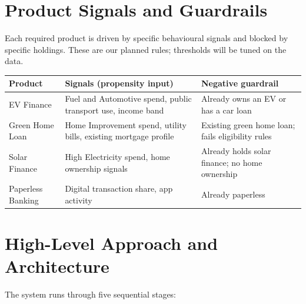 \documentclass[11pt,a4paper]{article}
\begin{document}
\section{Product Signals and Guardrails}
Each required product is driven by specific behavioural signals and blocked by specific holdings. These are our planned rules; thresholds will be tuned on the data.

\begin{center}
\small
\begin{tabular}{|p{3.2cm}|p{5.5cm}|p{5.9cm}|}
\hline
\textbf{Product} & \textbf{Signals (propensity input)} & \textbf{Negative guardrail} \\ \hline
EV Finance & Fuel and Automotive spend, public transport use, income band & Already owns an EV or has a car loan \\ \hline
Green Home Loan & Home Improvement spend, utility bills, existing mortgage profile & Existing green home loan; fails eligibility rules \\ \hline
Solar Finance & High Electricity spend, home ownership signals & Already holds solar finance; no home ownership \\ \hline
Paperless Banking & Digital transaction share, app activity & Already paperless \\ \hline
\end{tabular}
\end{center}

\newpage

\section{High-Level Approach and Architecture}
The system runs through five sequential stages:
\end{document}

